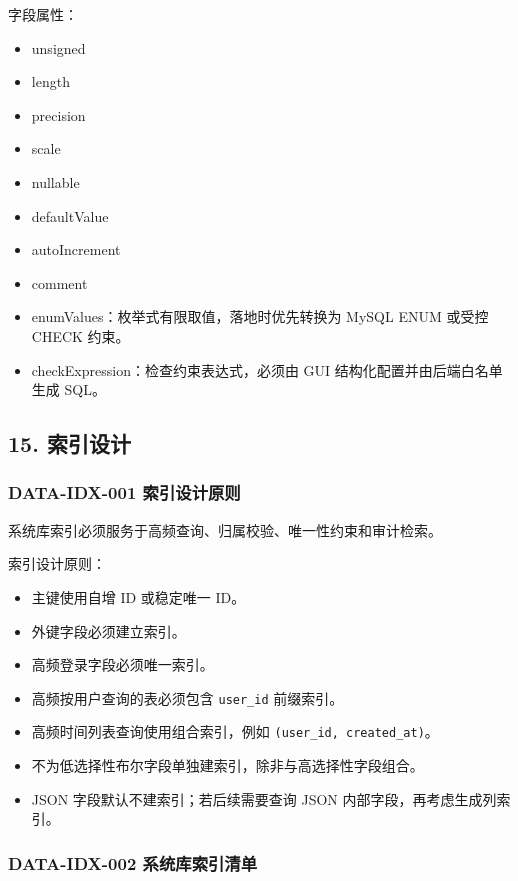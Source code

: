 \documentclass[
  a4paper,
  UTF8]{ctexart}
\providecommand{\tightlist}{%
  \setlength{\itemsep}{0pt}\setlength{\parskip}{0pt}}
\begin{document}
字段属性：

\begin{itemize}
\tightlist
\item
  unsigned
\item
  length
\item
  precision
\item
  scale
\item
  nullable
\item
  defaultValue
\item
  autoIncrement
\item
  comment
\item
  enumValues：枚举式有限取值，落地时优先转换为 MySQL ENUM 或受控 CHECK
  约束。
\item
  checkExpression：检查约束表达式，必须由 GUI
  结构化配置并由后端白名单生成 SQL。
\end{itemize}

\hypertarget{ux7d22ux5f15ux8bbeux8ba1}{%
\subsection{15. 索引设计}\label{ux7d22ux5f15ux8bbeux8ba1}}

\hypertarget{data-idx-001-ux7d22ux5f15ux8bbeux8ba1ux539fux5219}{%
\subsubsection{DATA-IDX-001
索引设计原则}\label{data-idx-001-ux7d22ux5f15ux8bbeux8ba1ux539fux5219}}

系统库索引必须服务于高频查询、归属校验、唯一性约束和审计检索。

索引设计原则：

\begin{itemize}
\tightlist
\item
  主键使用自增 ID 或稳定唯一 ID。
\item
  外键字段必须建立索引。
\item
  高频登录字段必须唯一索引。
\item
  高频按用户查询的表必须包含 \texttt{user\_id} 前缀索引。
\item
  高频时间列表查询使用组合索引，例如 \texttt{(user\_id,\ created\_at)}。
\item
  不为低选择性布尔字段单独建索引，除非与高选择性字段组合。
\item
  JSON 字段默认不建索引；若后续需要查询 JSON
  内部字段，再考虑生成列索引。
\end{itemize}

\hypertarget{data-idx-002-ux7cfbux7edfux5e93ux7d22ux5f15ux6e05ux5355}{%
\subsubsection{DATA-IDX-002
系统库索引清单}\label{data-idx-002-ux7cfbux7edfux5e93ux7d22ux5f15ux6e05ux5355}}
\end{document}
